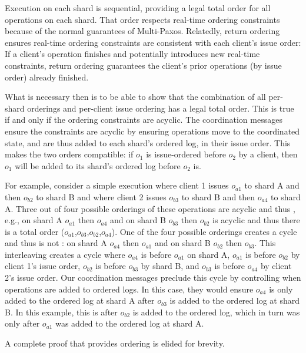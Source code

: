 Execution on each shard is sequential, providing a legal total order for all operations on each shard.
That order respects real-time ordering constraints because of the normal guarantees of Multi-Paxos.
Relatedly, return ordering ensures real-time ordering 
constraints are consistent with each client's issue order: If a client's operation finishes and potentially introduces new real-time constraints, return ordering guarantees the client's prior operations (by issue order) already finished.

What is necessary then is to be able to show that the combination of all per-shard orderings and per-client issue ordering has a legal total order.
This is true if and only if the ordering constraints are acyclic.
The coordination messages ensure the constraints are acyclic by ensuring operations move to the coordinated state, and are thus added to each shard's ordered log, in their issue order.
This makes the two orders compatible: if $o_1$ is issue-ordered before $o_2$ by a client, then $o_1$ will be added to its shard's ordered log before $o_2$ is.

For example, consider a simple execution where client 1 issues $o_{a1}$ to shard A and then $o_{b2}$ to shard B and where client 2 issues $o_{b3}$ to shard B and then $o_{a4}$ to shard A.
Three out of four possible orderings of these operations are acyclic and thus \mdl{},
e.g., on shard A $o_{a1}$ then $o_{a4}$ and on shard B $o_{b3}$ then $o_{b2}$ is acyclic and thus there is a total order ($o_{a1}$,$o_{b3}$,$o_{b2}$,$o_{a4}$).
One of the four possible orderings creates a cycle and thus is not \mdl{}:
on shard A $o_{a4}$ then $o_{a1}$ and on shard B $o_{b2}$ then $o_{b3}$.
This interleaving creates a cycle where $o_{a4}$ is before $o_{a1}$ on shard A, $o_{a1}$ is before $o_{b2}$ by client 1's issue order, $o_{b2}$ is before $o_{b3}$ by shard B, and $o_{b3}$ is before $o_{a4}$ by client 2's issue order.
Our coordination messages preclude this cycle by controlling when operations are added to ordered logs.
In this case, they would ensure $o_{a4}$ is only added to the ordered log at shard A after $o_{b3}$ is added to the ordered log at shard B. In this example, this is after $o_{b2}$ is added to the ordered log, which in turn was only after $o_{a1}$ was added to the ordered log at shard A.

A complete proof that \sys{} provides \Mdl{} ordering is elided for brevity.

